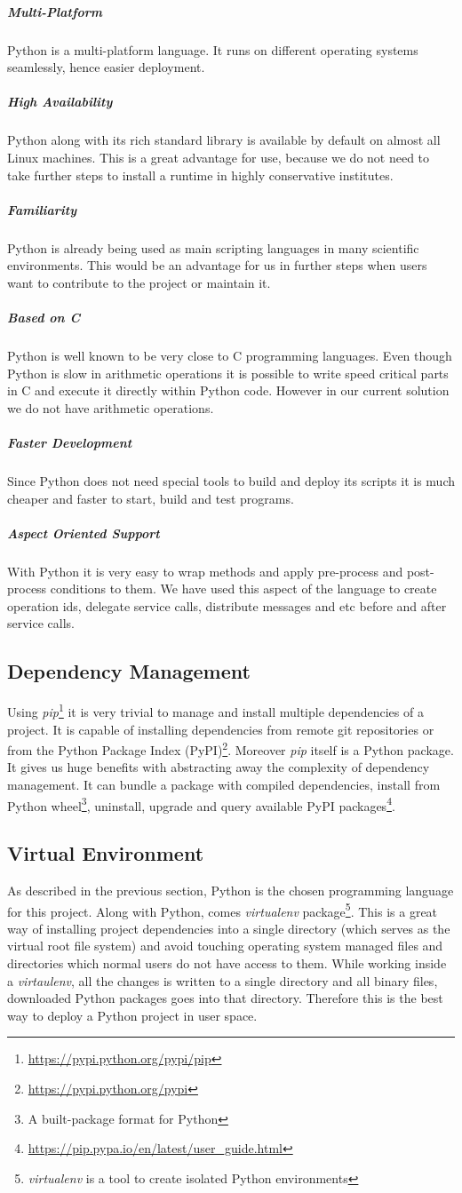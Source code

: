 \subparagraph{Multi-Platform} Python is a multi-platform language. It runs on different operating systems
seamlessly, hence easier deployment.
\subparagraph{High Availability} Python along with its rich standard library is available by default on almost all Linux machines. This
is a great advantage for use, because we do not need to take further steps to install a runtime in highly conservative institutes.
\subparagraph{Familiarity} Python is already being used as main scripting languages in many scientific environments. This would be an advantage
for us in further steps when users want to contribute to the project or maintain it.
\subparagraph{Based on C} Python is well known to be very close to C programming languages. Even though Python is slow in arithmetic operations
it is possible to write speed critical parts in C and execute it directly within Python code. However in our current solution we do not have
arithmetic operations.
\subparagraph{Faster Development} Since Python does not need special tools to build and deploy its scripts it is much cheaper and faster
to start, build and test programs.
\subparagraph{Aspect Oriented Support} With Python it is very easy to wrap methods and apply pre-process and post-process conditions to them. We have
used this aspect of the language to create operation ids, delegate service calls, distribute messages and etc before and after service calls.

\subsection{Dependency Management} Using \textit{pip}\footnote{\url{https://pypi.python.org/pypi/pip}}
it is very trivial to manage and install multiple
dependencies of a project. It is capable of installing dependencies from remote git repositories or from 
the Python Package Index (PyPI)\footnote{\url{https://pypi.python.org/pypi}}. Moreover \textit{pip} itself is
a Python package. It gives us huge benefits with abstracting away the complexity of dependency management. It can
bundle a package with compiled dependencies, install from Python wheel\footnote{A built-package format for Python}, uninstall,
upgrade and query available PyPI packages\footnote{\url{https://pip.pypa.io/en/latest/user_guide.html}}.

\subsection{Virtual Environment}
As described in the previous section, Python is the chosen programming language for this project. Along with Python, 
comes \textit{virtualenv} package\footnote{\textit{virtualenv} is a tool to create isolated Python environments}. This is a great way of installing
project dependencies into a single directory (which serves as the virtual root file system) and avoid touching operating system managed files and
directories which normal users do not have access to them. While working inside a \textit{virtaulenv}, all the changes is written to a single directory
and all binary files, downloaded Python packages goes into that directory. Therefore this is the best way to deploy a Python project in user space.

